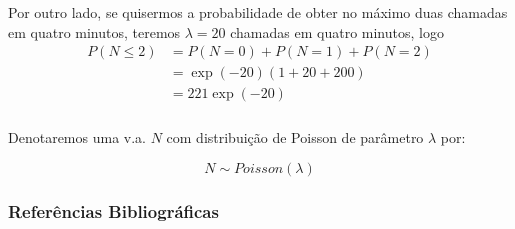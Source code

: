 \documentclass[14pt,aspectratio=1610]{beamer}
\begin{document}
\begin{frame}{}
\frametitle{}
\begin{block}{}
\justifying
Por outro lado, se quisermos a probabilidade de obter no máximo duas chamadas
em quatro minutos, teremos $\lambda=20$ chamadas em quatro minutos, logo
\begin{align*}
P(N\leq 2)&=P(N=0)+P(N=1)+P(N=2)\\
&=\exp{(-20)}(1+20+200)\\
&=221\exp{(-20)}
\end{align*}

\end{block}
\end{frame}

\begin{frame}{}
\frametitle{}
\begin{block}{}
\justifying
Denotaremos uma v.a. $N$ com distribuição de Poisson de parâmetro $\lambda$ por:

$$N\sim Poisson(\lambda)$$

\end{block}
\end{frame}


\begin{frame}{}
\frametitle{Referências Bibliográficas}

\end{frame}
\end{document}
